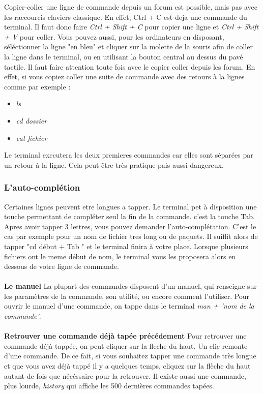 Copier-coller une ligne de commande depuis un forum est possible, mais pas avec les raccourcis claviers classique. En effet, Ctrl + C est deja une commande du terminal. Il faut donc faire \textit{Ctrl + Shift + C} pour copier une ligne et \textit{Ctrl + Shift + V} pour coller. Vous pouvez aussi, pour les ordinateurs en disposant, séléctionner la ligne "en bleu" et cliquer sur la molette de la souris afin de coller la ligne dans le terminal, ou en utilisant la bouton central au dessus du pavé tactile. 
Il faut faire attention toute fois avec le copier coller depuis les forum. En effet, si vous copiez coller une suite de commande avec des retours à la lignes comme par exemple :

\begin{itemize}
\item \textit{ls}
\item \textit{cd dossier}
\item \textit{cat fichier}
\end{itemize}

Le terminal executera les deux premieres commandes car elles sont séparées par un retour à la ligne. Cela peut être très pratique pais aussi dangereux.
\subsubsection{L'auto-complétion}
Certaines lignes peuvent etre longues a tapper. Le terminal pet à disposition une touche permettant de compléter seul la fin de la commande. c'est la touche Tab. Apres avoir tapper 3 lettres, vous pouvez demander l'auto-complétation. C'est le cas par exemple pour un nom de fichier tres long ou de paquets. Il suiffit alors de tapper "cd début + Tab " et le terminal finira à votre place. Lorsque plusieurs fichiers ont le meme début de nom, le terminal vous les proposera alors en dessous de votre ligne de commande.

\paragraph{}
\textbf{Le manuel}
La plupart des commandes disposent d'un manuel, qui renseigne sur les paramètres de la commande, son utilité, ou encore comment l'utiliser. Pour ouvrir le manuel d'une commande, on tappe dans le terminal \textit{man + 'nom de la commande'}.

\paragraph{}
\textbf{Retrouver une commande déjà tapée précédement}
Pour retrouver une commande déjà tappée, on peut cliquer sur la fleche du haut. Un clic remonte d'une commande. De ce fait, si vous souhaitez tapper une commande très longue et que vous avez déjà tappé il y a quelques temps, cliquez sur la flèche du haut autant de fois que nécéssaire pour la retrouver.
Il existe aussi une commande, plus lourde, \textit{history} qui affiche les 500 dernières commandes tapées.

